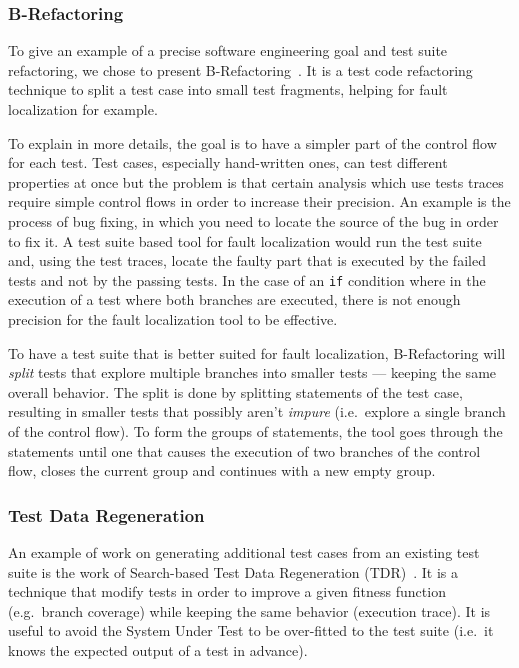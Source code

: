 \documentclass[11pt]{sdm}
\begin{document}
\subsubsection{B-Refactoring}
\label{brefactoring}
To give an example of a precise software engineering goal and test suite refactoring, we chose to present B-Refactoring~\cite{xuan2016b}.
It is a test code refactoring technique to split a test case into small test fragments, helping for fault localization for example.

To explain in more details, the goal is to have a simpler part of the control flow for each test.
Test cases, especially hand-written ones, can test different properties at once but the problem is that certain analysis which use tests traces require simple control flows in order to increase their precision.
An example is the process of bug fixing, in which you need to locate the source of the bug in order to fix it.
A test suite based tool for fault localization would run the test suite and, using the test traces, locate the faulty part that is executed by the failed tests and not by the passing tests.
In the case of an \texttt{if} condition where in the execution of a test where both branches are executed, there is not enough precision for the fault localization tool to be effective.

To have a test suite that is better suited for fault localization, B-Refactoring will \textit{split} tests that explore multiple branches into smaller tests --- keeping the same overall behavior.
The split is done by splitting statements of the test case, resulting in smaller tests that possibly aren't \textit{impure} (i.e.\ explore a single branch of the control flow).
To form the groups of statements, the tool goes through the statements until one that causes the execution of two branches of the control flow, closes the current group and continues with a new empty group.

\subsubsection{Test Data Regeneration}
\label{tdr}
An example of work on generating additional test cases from an existing test suite is the work of Search-based Test Data Regeneration (TDR)~\cite{yoo2012test}.
It is a technique that modify tests in order to improve a given fitness function (e.g.\ branch coverage) while keeping the same behavior (execution trace).
It is useful to avoid the System Under Test to be over-fitted to the test suite (i.e.\ it knows the expected output of a test in advance).
\end{document}
